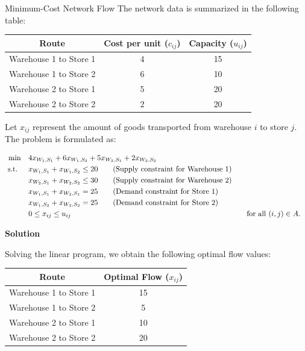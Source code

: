 \begin{examplewithallcode}{Minimum-Cost Network Flow}
The network data is summarized in the following table:

    \begin{tabular}{|c|c|c|}
        \hline
        Route & Cost per unit ($c_{ij}$) & Capacity ($u_{ij}$) \\
        \hline
        Warehouse 1 to Store 1 & 4 & 15 \\
        Warehouse 1 to Store 2 & 6 & 10 \\
        Warehouse 2 to Store 1 & 5 & 20 \\
        Warehouse 2 to Store 2 & 2 & 20 \\
        \hline
    \end{tabular}
\par{}\label{tab:modeling-sums-continued-tab01}%



Let \( x_{ij} \) represent the amount of goods transported from warehouse \( i \) to store \( j \). The problem is formulated as:

\begin{align}
\min \quad & 4x_{W_1,S_1} + 6x_{W_1,S_2} + 5x_{W_2,S_1} + 2x_{W_2,S_2}\label{eq:example_objective} \\
    \text{ s.t. } \quad
    & x_{W_1,S_1} + x_{W_1,S_2} \leq 20   \tag{Supply constraint for Warehouse 1}\label{eq:supply1} \\
    & x_{W_2,S_1} + x_{W_2,S_2} \leq 30   \tag{Supply constraint for Warehouse 2}\label{eq:supply2} \\
    & x_{W_1,S_1} + x_{W_2,S_1} = 25   \tag{Demand constraint for Store 1}\label{eq:demand1} \\
    & x_{W_1,S_2} + x_{W_2,S_2} = 25   \tag{Demand constraint for Store 2}\label{eq:demand2} \\
    & 0 \leq x_{ij} \leq u_{ij} &&\quad \text{for all } (i,j) \in A.\label{eq:capacity_constraint_example}
\end{align}

\textbf{Solution}

Solving the linear program, we obtain the following optimal flow values:

    \begin{tabular}{|c|c|}
        \hline
        Route & Optimal Flow ($x_{ij}$) \\
        \hline
        Warehouse 1 to Store 1 & 15 \\
        Warehouse 1 to Store 2 & 5 \\
        Warehouse 2 to Store 1 & 10 \\
        Warehouse 2 to Store 2 & 20 \\
        \hline
    \end{tabular}
\par{}\label{tab:modeling-sums-continued-tab02}%



\end{examplewithallcode}
